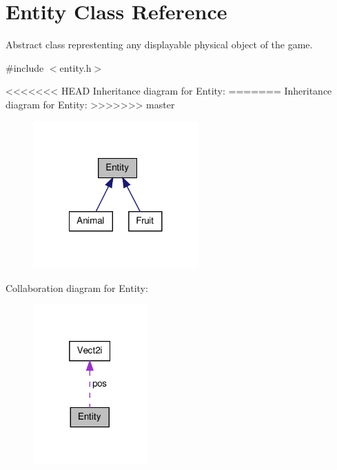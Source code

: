\hypertarget{class_entity}{\section{Entity Class Reference}
\label{class_entity}
}


Abstract class represtenting any displayable physical object of the game.  




{\ttfamily \#include $<$entity.\-h$>$}



<<<<<<< HEAD
Inheritance diagram for Entity\-:
\nopagebreak
=======
Inheritance diagram for Entity\-:\nopagebreak
>>>>>>> master
\begin{figure}[H]
\begin{center}
\leavevmode
\includegraphics[width=180pt]{class_entity__inherit__graph}
\end{center}
\end{figure}


Collaboration diagram for Entity\-:
\nopagebreak
\begin{figure}[H]
\begin{center}
\leavevmode
\includegraphics[width=124pt]{class_entity__coll__graph}
\end{center}
\end{figure}
